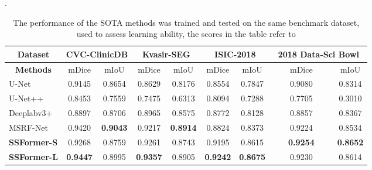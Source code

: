 \documentclass[runningheads]{llncs}
\begin{document}
\begin{table}[htbp]\scriptsize\centering
\renewcommand\arraystretch{1.2}
\caption{The performance of the SOTA methods was trained and tested on the same benchmark dataset, used to assess learning ability, the scores in the table refer to \cite{srivastava2021msrf}}.
\label{LA}
\begin{tabular}{|l|cc|cc|cc|cc|}
\hline
\multicolumn{1}{|c|}{\textbf{Dataset}} & \multicolumn{2}{c|}{\textbf{CVC-ClinicDB}}             & \multicolumn{2}{c|}{\textbf{Kvasir-SEG}}               & \multicolumn{2}{c|}{\textbf{ISIC-2018}}                & \multicolumn{2}{c|}{\textbf{2018 Data-Sci Bowl}}       \\ \hline
\multicolumn{1}{|c|}{\textbf{Methods}} & \multicolumn{1}{c|}{mDice}           & mIoU            & \multicolumn{1}{c|}{mDice}           & mIoU            & \multicolumn{1}{c|}{mDice}           & mIoU            & \multicolumn{1}{c|}{~~~~mDice~~~~}           & mIoU            \\ \hline
U-Net                                  & \multicolumn{1}{c|}{0.9145}          & 0.8654          & \multicolumn{1}{c|}{0.8629}          & 0.8176          & \multicolumn{1}{c|}{0.8554}          & 0.7847          & \multicolumn{1}{c|}{0.9080}          & 0.8314          \\ \hline
U-Net++                                & \multicolumn{1}{c|}{0.8453}          & 0.7559          & \multicolumn{1}{c|}{0.7475}          & 0.6313          & \multicolumn{1}{c|}{0.8094}          & 0.7288          & \multicolumn{1}{c|}{0.7705}          & 0.3010          \\ \hline
Deeplabv3+                             & \multicolumn{1}{c|}{0.8897}          & 0.8706          & \multicolumn{1}{c|}{0.8965}          & 0.8575          & \multicolumn{1}{c|}{0.8772}          & 0.8128          & \multicolumn{1}{c|}{0.8857}          & 0.8367          \\ \hline
MSRF-Net                               & \multicolumn{1}{c|}{0.9420}          & \textbf{0.9043} & \multicolumn{1}{c|}{0.9217}          & \textbf{0.8914} & \multicolumn{1}{c|}{0.8824}          & 0.8373          & \multicolumn{1}{c|}{0.9224}          & 0.8534          \\ \hline
\textbf{SSFormer-S}                    & \multicolumn{1}{c|}{0.9268}          & 0.8759          & \multicolumn{1}{c|}{0.9261}          & 0.8743          & \multicolumn{1}{c|}{0.9195}          & 0.8615          & \multicolumn{1}{c|}{\textbf{0.9254}} & \textbf{0.8652} \\ \hline
\textbf{SSFormer-L}                    & \multicolumn{1}{c|}{\textbf{0.9447}} & 0.8995          & \multicolumn{1}{c|}{\textbf{0.9357}} & 0.8905          & \multicolumn{1}{c|}{\textbf{0.9242}} & \textbf{0.8675} & \multicolumn{1}{c|}{0.9230}          & 0.8614          \\ \hline
\end{tabular}
\end{table}
\end{document}
